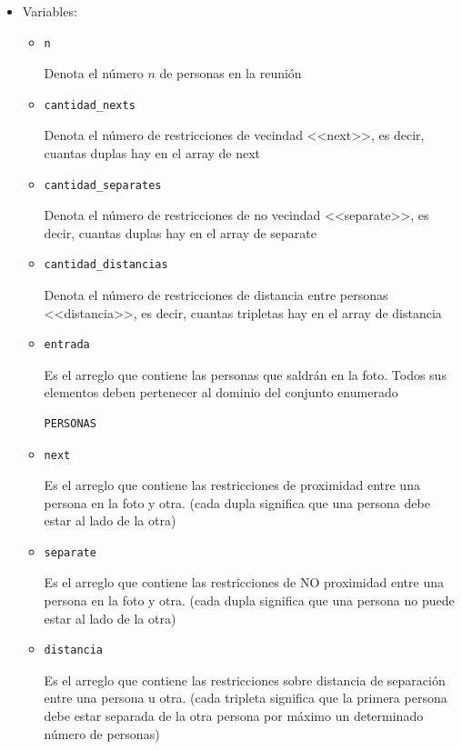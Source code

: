 \documentclass[12pt]{article}
\begin{document}
\begin{itemize}
\item Variables:
\begin{itemize}
\item \begin{verbatim}
n
\end{verbatim}
Denota el número $n$ de personas en la reunión
\item \begin{verbatim}
cantidad_nexts
\end{verbatim}
Denota el número de restricciones de vecindad <<next>>, es decir, cuantas duplas hay en el array de next
\item \begin{verbatim}
cantidad_separates
\end{verbatim}
Denota el número de restricciones de no vecindad <<separate>>, es decir, cuantas duplas hay en el array de separate
\item \begin{verbatim}
cantidad_distancias
\end{verbatim}
Denota el número de restricciones de distancia entre personas <<distancia>>, es decir, cuantas tripletas hay en el array de distancia
\item \begin{verbatim}
entrada
\end{verbatim}
Es el arreglo que contiene las personas que saldrán en la foto. Todos sus elementos deben pertenecer al dominio del conjunto enumerado
\begin{verbatim}
PERSONAS
\end{verbatim}
\item \begin{verbatim}
next
\end{verbatim}
Es el arreglo que contiene las restricciones de proximidad entre una persona en la foto y otra. (cada dupla significa que una persona debe estar al lado de la otra)
\item \begin{verbatim}
separate
\end{verbatim}
Es el arreglo que contiene las restricciones de NO proximidad entre una persona en la foto y otra. (cada dupla significa que una persona no puede estar al lado de la otra)
\item \begin{verbatim}
distancia
\end{verbatim}
Es el arreglo que contiene las restricciones sobre distancia de separación entre una persona u otra. (cada tripleta significa que la primera persona debe estar separada de la otra persona por máximo un determinado número de personas)

\end{itemize}
\end{itemize}
\end{document}
